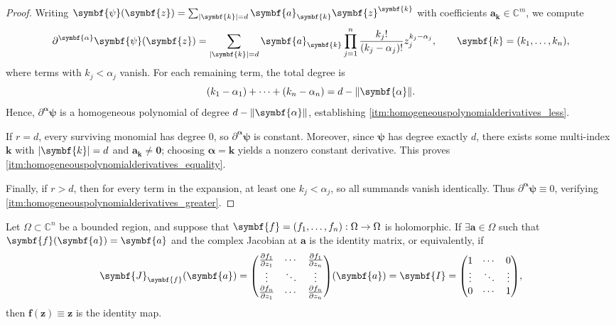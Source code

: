 \begin{proof}
    Writing \(\symbf{\psi}(\symbf{z})=\sum_{\abs{\symbf{k}}=d}\symbf{a}_{\symbf{k}}\symbf{z}^{\symbf{k}}\) with coefficients \(\symbf{a}_{\symbf{k}}\in\mathbb{C}^m\), we compute
    \[\partial^{\symbf{\alpha}}\symbf{\psi}(\symbf{z})=\sum_{\abs{\symbf{k}}=d}\symbf{a}_{\symbf{k}}\prod_{j=1}^n\frac{k_j!}{(k_j-\alpha_j)!}z_j^{k_j-\alpha_j},\qquad\symbf{k}=\qty(k_1,\dots,k_n),\]
    where terms with \(k_j<\alpha_j\) vanish. For each remaining term, the total degree is
    \[(k_1-\alpha_1)+\cdots+(k_n-\alpha_n)=d-\norm{\symbf{\alpha}}.\]
    Hence, \(\partial^{\symbf{\alpha}}\symbf{\psi}\) is a homogeneous polynomial of degree \(d-\norm{\symbf{\alpha}}\), establishing \cref{itm:homogeneouspolynomialderivatives_less}.

    If \(r=d\), every surviving monomial has degree \(0\), so \(\partial^{\symbf{\alpha}}\symbf{\psi}\) is constant. Moreover, since \(\symbf{\psi}\) has degree exactly \(d\), there exists some multi-index \(\symbf{k}\) with \(\abs{\symbf{k}}=d\) and \(\symbf{a}_{\symbf{k}}\neq\symbf{0}\); choosing \(\symbf{\alpha}=\symbf{k}\) yields a nonzero constant derivative. This proves \cref{itm:homogeneouspolynomialderivatives_equality}.

    Finally, if \(r>d\), then for every term in the expansion, at least one \(k_j<\alpha_j\), so all summands vanish identically. Thus \(\partial^{\symbf{\alpha}}\symbf{\psi}\equiv 0\), verifying \cref{itm:homogeneouspolynomialderivatives_greater}.
\end{proof}
\begin{lemma}[Cartan]\label{lem:multivarcartan1}
    Let \(\Omega\subset\mathbb{C}^n\) be a bounded region, and suppose that \(\symbf{f}=\qty(f_1,\ldots,f_n):\Omega\to\Omega\) is holomorphic. If \(\exists\symbf{a}\in\Omega\) such that \(\symbf{f}\qty(\symbf{a})=\symbf{a}\) and the complex Jacobian at \(\symbf{a}\) is the identity matrix, or equivalently, if
    \begin{equation}
        \symbf{J}_{\symbf{f}}\qty(\symbf{a})=\mqty(\pdv{f_1}{z_1}&\cdots&\pdv{f_1}{z_n}\\\vdots&\ddots&\vdots\\\pdv{f_n}{z_1}&\cdots&\pdv{f_n}{z_n})(\symbf{a})=\symbf{I}=\mqty(1&\cdots&0\\\vdots&\ddots&\vdots\\0&\cdots&1),\label{eq:multivarcartan1_jacobian}
    \end{equation} then \(\symbf{f}(\symbf{z})\equiv\symbf{z}\) is the identity map.
\end{lemma}
